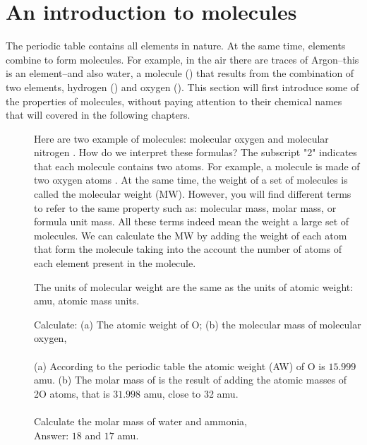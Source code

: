 \documentclass[main.tex]{subfiles}
\begin{document}
\section{An introduction to molecules}
The periodic table contains all elements in nature. At the same time, elements combine to form molecules. For example, in the air there are traces of Argon--this is an element--and also water, a molecule () that results from the combination of two elements, hydrogen () and oxygen (). This section will first introduce some of the properties of molecules, without paying attention to their chemical names that will covered in the following chapters.
\sloppy
\begin{description}
\item[] 
Here are two example of molecules: molecular oxygen  and molecular nitrogen . How do we interpret these formulas? The subscript "2" indicates that each molecule contains two atoms. For example, a  molecule is made of two oxygen atoms . At the same time, the weight of a set of molecules is called the molecular weight (MW). However, you will find different terms to refer to the same property such as: molecular mass, molar mass, or formula unit mass. All these terms indeed mean the weight a large set of molecules. We can calculate the MW by adding the weight of each atom that form the molecule taking into the account the number of atoms of each element present in the molecule.
\item[] The units of molecular weight are the same as the units of atomic weight: amu, atomic mass units.

\begin{example} %
Calculate: (a) The atomic weight of O; (b) the molecular mass of molecular oxygen,  \\
\\
(a) According to the periodic table the atomic weight (AW) of O is $15.999$ amu. (b) The molar mass of  is the result of adding the atomic masses of 2O atoms, that is $31.998$ amu, close to 32 amu.\\
\faDiamond\ \\
Calculate the molar mass of water  and ammonia, \\
\flushright Answer: $18$ and $17$ amu.
\end{example}%


\end{description}
\end{document}
